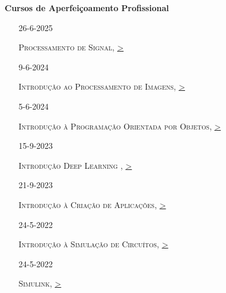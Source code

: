 \documentclass[10pt,a4paper,oneside]{article}
\newlength{\datewidth}
\newlength{\textindent}
\begin{document}
	\textbf{\hspace{\textindent}Cursos de Aperfeiçoamento Profissional}
	\begin{itemize}
\sloppy		
\item[\hspace{\datewidth}\scriptsize 26-6-2025] \parbox[t]{\dimexpr\linewidth-\datewidth-\textindent}{\textsc{Processamento de Signal}, \href{https://matlabacademy.mathworks.com/progress/share/certificate.html?id=8d446314-2eac-4c3c-9809-fff2192233a2&}{>}}

\item[\hspace{\datewidth}\scriptsize 9-6-2024] \parbox[t]{\dimexpr\linewidth-\datewidth-\textindent}{\textsc{Introdução ao Processamento de Imagens}, \href{https://matlabacademy.mathworks.com/progress/share/report.html?id=c9b24992-b614-48d2-a06f-0546c9d9d412&}{>}}
   
\item[\hspace{\datewidth}\scriptsize 5-6-2024] \parbox[t]{\dimexpr\linewidth-\datewidth-\textindent}{\textsc{Introdução à Programação Orientada por Objetos}, \href{https://matlabacademy.mathworks.com/progress/share/certificate.html?id=5cce993d-1378-4817-a016-cfdc909eef1f&}{>}}
       
\item[\hspace{\datewidth}\scriptsize 15-9-2023] \parbox[t]{\dimexpr\linewidth-\datewidth-\textindent}{\textsc{Introdução Deep Learning }, \href{https://matlabacademy.mathworks.com/progress/share/report.html?id=a773357e-1315-4d27-8bdc-ff2af04983a1&}{>}}

\item[\hspace{\datewidth}\scriptsize 21-9-2023] \parbox[t]{\dimexpr\linewidth-\datewidth-\textindent}{\textsc{Introdução à Criação de Aplicações}, \href{https://matlabacademy.mathworks.com/progress/share/report.html?id=8db10b82-5beb-4543-87c7-c8e13c5f7ccf&}{>}}

\item[\hspace{\datewidth}\scriptsize 24-5-2022] \parbox[t]{\dimexpr\linewidth-\datewidth-\textindent}{\textsc{Introdução à Simulação de Circuítos}, \href{https://matlabacademy.mathworks.com/progress/share/report.html?id=8e8b78c7-bd81-496c-b869-37bb71db1a39&}{>}}

\item[\hspace{\datewidth}\scriptsize 24-5-2022] \parbox[t]{\dimexpr\linewidth-\datewidth-\textindent}{\textsc{Simulink}, \href{https://matlabacademy.mathworks.com/progress/share/report.html?id=9a64293c-a2bd-48b0-b613-dc2d2b0ed99d&}{>}}
    
\end{itemize}
\end{document}
